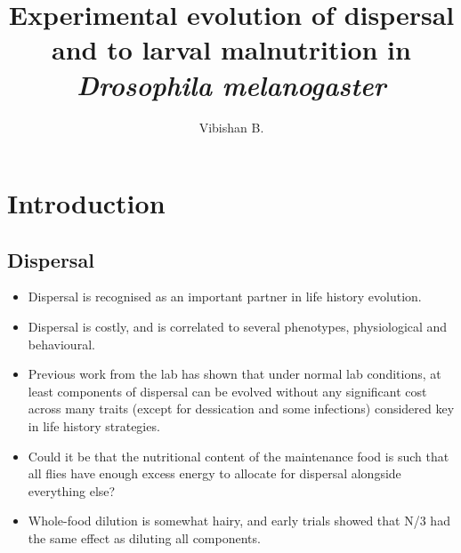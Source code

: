 \documentclass[12pt,onecolumn,twoside]{article}
\author{Vibishan B.}
\affil{Department of Biology, Indian Institute of Science Education and Research (IISER), Pune}
\title{Experimental evolution of dispersal and to larval malnutrition in \textit{Drosophila melanogaster}}
\date{\empty}
\begin{document}
	\maketitle
	\section{Introduction}

	\subsection{Dispersal}
	\begin{itemize}
		\item Dispersal is recognised as an important partner in life history evolution.
		\item Dispersal is costly, and is correlated to several phenotypes, physiological and behavioural.
		\item Previous work from the lab has shown that under normal lab conditions, at least components of dispersal can be evolved without any significant cost across many traits (except for dessication and some infections) considered key in life history strategies.
		\item Could it be that the nutritional content of the maintenance food is such that all flies have enough excess energy to allocate for dispersal alongside everything else?
		\item Whole-food dilution is somewhat hairy, and early trials showed that N/3 had the same effect as diluting all components.
	\end{itemize}
\end{document}
